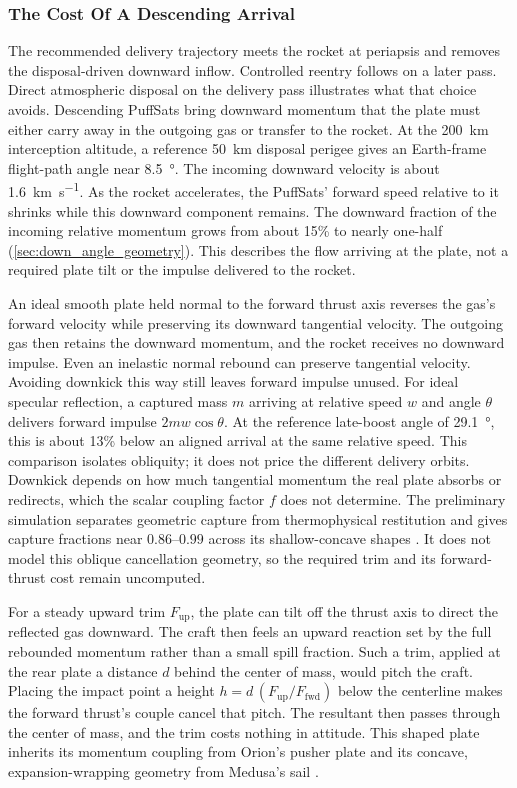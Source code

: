 \documentclass{article}
\begin{document}
\subsubsection{The Cost Of A Descending Arrival}\label{sec:pusher_plate_down_kick}
The recommended delivery trajectory meets the rocket at periapsis and removes the disposal-driven downward inflow. Controlled reentry follows on a later pass. Direct atmospheric disposal on the delivery pass illustrates what that choice avoids. Descending PuffSats bring downward momentum that the plate must either carry away in the outgoing gas or transfer to the rocket. At the \SI{200}{\kilo\meter} interception altitude, a reference \SI{50}{\kilo\meter} disposal perigee gives an Earth-frame flight-path angle near \SI{8.5}{\degree}. The incoming downward velocity is about \SI{1.6}{\kilo\meter\per\second}. As the rocket accelerates, the PuffSats' forward speed relative to it shrinks while this downward component remains. The downward fraction of the incoming relative momentum grows from about 15\% to nearly one-half (\autoref{sec:down_angle_geometry}). This describes the flow arriving at the plate, not a required plate tilt or the impulse delivered to the rocket.

An ideal smooth plate held normal to the forward thrust axis reverses the gas's forward velocity while preserving its downward tangential velocity. The outgoing gas then retains the downward momentum, and the rocket receives no downward impulse. Even an inelastic normal rebound can preserve tangential velocity. Avoiding downkick this way still leaves forward impulse unused. For ideal specular reflection, a captured mass $m$ arriving at relative speed $w$ and angle $\theta$ delivers forward impulse $2mw\cos\theta$. At the reference late-boost angle of \SI{29.1}{\degree}, this is about 13\% below an aligned arrival at the same relative speed. This comparison isolates obliquity; it does not price the different delivery orbits. Downkick depends on how much tangential momentum the real plate absorbs or redirects, which the scalar coupling factor $f$ does not determine. The preliminary simulation separates geometric capture from thermophysical restitution and gives capture fractions near $0.86$--$0.99$ across its shallow-concave shapes \cite{Katz_puffsat_impact_sim_2026}. It does not model this oblique cancellation geometry, so the required trim and its forward-thrust cost remain uncomputed.

For a steady upward trim $F_{\mathrm{up}}$, the plate can tilt off the thrust axis to direct the reflected gas downward. The craft then feels an upward reaction set by the full rebounded momentum rather than a small spill fraction. Such a trim, applied at the rear plate a distance $d$ behind the center of mass, would pitch the craft. Placing the impact point a height $h = d\,(F_{\mathrm{up}}/F_{\mathrm{fwd}})$ below the centerline makes the forward thrust's couple cancel that pitch. The resultant then passes through the center of mass, and the trim costs nothing in attitude. This shaped plate inherits its momentum coupling from Orion's pusher plate \cite{projorion} and its concave, expansion-wrapping geometry from Medusa's sail \cite{solem_medusa}.
\end{document}

